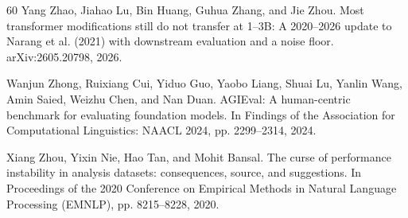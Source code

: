 \begin{thebibliography}{60}
Yang Zhao, Jiahao Lu, Bin Huang, Guhua Zhang, and Jie Zhou. Most transformer modifications still do not transfer at 1--3{B}: A 2020--2026 update to Narang et al. (2021) with downstream evaluation and a noise floor. arXiv:2605.20798, 2026.

Wanjun Zhong, Ruixiang Cui, Yiduo Guo, Yaobo Liang, Shuai Lu, Yanlin Wang, Amin Saied, Weizhu Chen, and Nan Duan. AGIEval: A human-centric benchmark for evaluating foundation models. In Findings of the Association for Computational Linguistics: NAACL 2024, pp. 2299--2314, 2024.

Xiang Zhou, Yixin Nie, Hao Tan, and Mohit Bansal. The curse of performance instability in analysis datasets: consequences, source, and suggestions. In Proceedings of the 2020 Conference on Empirical Methods in Natural Language Processing (EMNLP), pp. 8215--8228, 2020.

\end{thebibliography}
